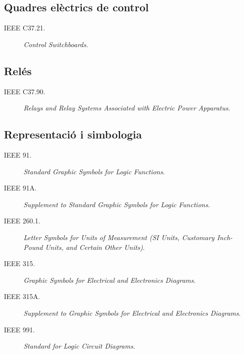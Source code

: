 \subsection*{Quadres elèctrics de control}
\begin{description}
    \item [\hspace{5mm}IEEE C37.21.] \textit{Control Switchboards}.
\end{description}


\subsection*{Relés}
\begin{description}
    \item [\hspace{5mm}IEEE C37.90.] \textit{Relays and Relay Systems Associated with Electric Power Apparatus}.
\end{description}


\subsection*{Representació i simbologia}
\begin{description}
    \item [\hspace{5mm}IEEE 91.] \textit{Standard Graphic Symbols for Logic Functions}.
    \item [\hspace{5mm}IEEE 91A.] \textit{Supplement to Standard Graphic Symbols for Logic Functions}.
    \item [\hspace{5mm}IEEE 260.1.] \textit{Letter Symbols for Units of Measurement (SI Units, Customary Inch-Pound Units, and Certain Other Units)}.
    \item [\hspace{5mm}IEEE 315.] \textit{Graphic Symbols for Electrical and Electronics Diagrams}.
    \item [\hspace{5mm}IEEE 315A.] \textit{Supplement to Graphic Symbols for Electrical and Electronics Diagrams}.
    \item [\hspace{5mm}IEEE 991.] \textit{Standard for Logic Circuit Diagrams}.
\end{description}

